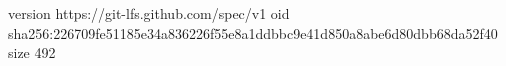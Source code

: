 version https://git-lfs.github.com/spec/v1
oid sha256:226709fe51185e34a836226f55e8a1ddbbc9e41d850a8abe6d80dbb68da52f40
size 492
